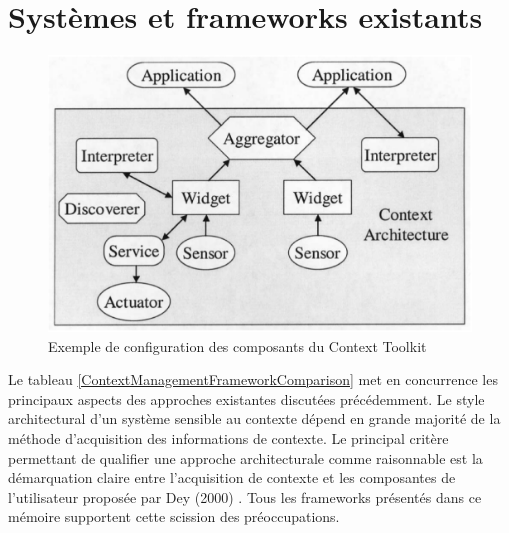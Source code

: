 \section{Systèmes et frameworks existants}

\begin{figure}[H]
    \centerline{\includegraphics[width=.37\textwidth]{img/context_toolkit}}
    \caption{Exemple de configuration des composants du Context Toolkit}
    \label{Contexttoolkit}
\end{figure}

Le tableau \ref{ContextManagementFrameworkComparison} met en concurrence les
principaux aspects des approches existantes discutées précédemment. Le style
architectural d'un système sensible au contexte dépend en grande majorité de la
méthode d'acquisition des informations de contexte. Le principal critère
permettant de qualifier une approche architecturale comme raisonnable est la
démarquation claire entre l'acquisition de contexte et les composantes de
l'utilisateur proposée par Dey (2000) \cite{dey_providing_2000}. Tous les
frameworks présentés dans ce mémoire supportent cette scission des
préoccupations.

